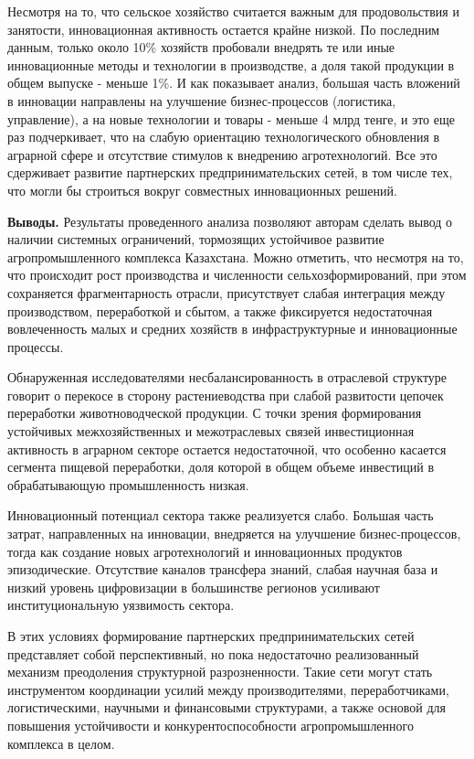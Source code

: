\begin{multicols}{2}
Несмотря на то, что сельское хозяйство считается важным для
продовольствия и занятости, инновационная активность остается крайне
низкой. По последним данным, только около 10\% хозяйств пробовали
внедрять те или иные инновационные методы и технологии в производстве, а
доля такой продукции в общем выпуске - меньше 1\%. И как показывает
анализ, большая часть вложений в инновации направлены на улучшение
бизнес-процессов (логистика, управление), а на новые технологии и товары
- меньше 4 млрд тенге, и это еще раз подчеркивает, что на слабую
ориентацию технологического обновления в аграрной сфере и отсутствие
стимулов к внедрению агротехнологий. Все это сдерживает развитие
партнерских предпринимательских сетей, в том числе тех, что могли бы
строиться вокруг совместных инновационных решений.

{\bfseries Выводы.} Результаты проведенного анализа позволяют авторам
сделать вывод о наличии системных ограничений, тормозящих устойчивое
развитие агропромышленного комплекса Казахстана. Можно отметить, что
несмотря на то, что происходит рост производства и численности
сельхозформирований, при этом сохраняется фрагментарность отрасли,
присутствует слабая интеграция между производством, переработкой и
сбытом, а также фиксируется недостаточная вовлеченность малых и средних
хозяйств в инфраструктурные и инновационные процессы.

Обнаруженная исследователями несбалансированность в отраслевой структуре
говорит о перекосе в сторону растениеводства при слабой развитости
цепочек переработки животноводческой продукции. С точки зрения
формирования устойчивых межхозяйственных и межотраслевых связей
инвестиционная активность в аграрном секторе остается недостаточной, что
особенно касается сегмента пищевой переработки, доля которой в общем
объеме инвестиций в обрабатывающую промышленность низкая.

Инновационный потенциал сектора также реализуется слабо. Большая часть
затрат, направленных на инновации, внедряется на улучшение
бизнес-процессов, тогда как создание новых агротехнологий и
инновационных продуктов эпизодические. Отсутствие каналов трансфера
знаний, слабая научная база и низкий уровень цифровизации в большинстве
регионов усиливают институциональную уязвимость сектора.

В этих условиях формирование партнерских предпринимательских сетей
представляет собой перспективный, но пока недостаточно реализованный
механизм преодоления структурной разрозненности. Такие сети могут стать
инструментом координации усилий между производителями, переработчиками,
логистическими, научными и финансовыми структурами, а также основой для
повышения устойчивости и конкурентоспособности агропромышленного
комплекса в целом.
\end{multicols}


